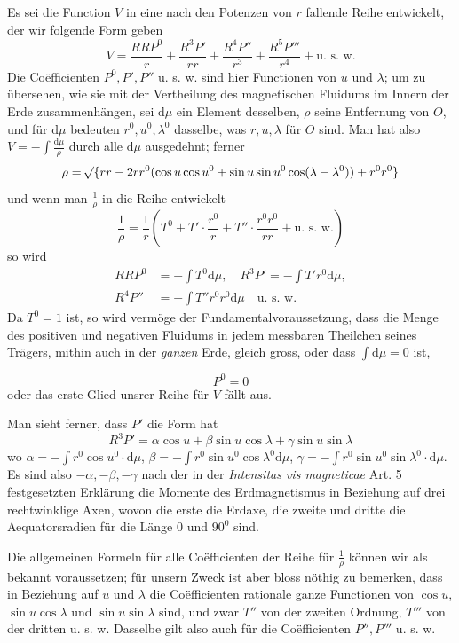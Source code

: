 Es sei die Function $V$ in eine nach den Potenzen von $r$ fallende Reihe entwickelt, der wir folgende Form geben
\[
V=\frac{RRP^0}{r}+\frac{R^3P'}{rr}+\frac{R^4P''}{r^3}+\frac{R^5P'''}{r^4}+\text{u. s. w.}
\]
Die Coëfficienten $P^0,P',P''$ u. s. w. sind hier Functionen von $u$ und $\lambda$; um zu übersehen, wie sie mit der Vertheilung des magnetischen Fluidums im Innern der Erde zusammenhängen, sei $\mathrm{d}\mu$ ein Element desselben, $\rho$ seine Entfernung von $O$, und für $\mathrm{d}\mu$ bedeuten $r^0,u^0,\lambda^0$ dasselbe, was $r,u,\lambda$ für $O$ sind. Man hat also $V=-\int\frac{\mathrm{d}\mu}{\rho}$ durch alle $\mathrm{d}\mu$ ausgedehnt; ferner
\[
\rho=\mathord{{}^{}\!\surd}\{rr-2rr^0(\cos u\cos u^0+\sin u\sin u^0\cos(\lambda-\lambda^0))+r^0r^0\}
\]
und wenn man $\frac1\rho$ in die Reihe entwickelt
\[
\frac1\rho=\frac1r(T^0+T'\cdot\frac{r^0}{r}+T''\cdot\frac{r^0r^0}{rr}+\text{u. s. w.})
\]
so wird
\[
\begin{aligned}RRP^0&=-\int T^0\mathrm{d}\mu,\quad R^3P'=-\int T'r^0\mathrm{d}\mu,\\R^4P''&=-\int T''r^0r^0\mathrm{d}\mu\quad\text{u. s. w.}\end{aligned}
\]
Da $T^0=1$ ist, so wird vermöge der Fundamentalvoraussetzung, dass die Menge des positiven und negativen Fluidums in jedem messbaren Theilchen seines Trägers, mithin auch in der \textit{ganzen} Erde, gleich gross, oder dass $\int\mathrm{d}\mu=0$ ist,
\par\clearpage
{}
\[
P^0=0
\]
oder das erste Glied unsrer Reihe für $V$ fällt aus.

Man sieht ferner, dass $P'$ die Form hat
\[
R^3P'=\alpha\cos u+\beta\sin u\cos\lambda+\gamma\sin u\sin\lambda
\]
wo $\alpha=-\int r^0\cos u^0\cdot\mathrm{d}\mu$, $\beta=-\int r^0\sin u^0\cos\lambda^0\mathrm{d}\mu$, $\gamma=-\int r^0\sin u^0\sin\lambda^0\cdot\mathrm{d}\mu$. Es sind also $-\alpha,-\beta,-\gamma$ nach der in der \textit{Intensitas vis magneticae} Art. 5 festgesetzten Erklärung die Momente des Erdmagnetismus in Beziehung auf drei rechtwinklige Axen, wovon die erste die Erdaxe, die zweite und dritte die Aequatorsradien für die Länge $0$ und $90^0$ sind.

Die allgemeinen Formeln für alle Coëfficienten der Reihe für $\frac1\rho$ können wir als bekannt voraussetzen; für unsern Zweck ist aber bloss nöthig zu bemerken, dass in Beziehung auf $u$ und $\lambda$ die Coëfficienten rationale ganze Functionen von $\cos u$, $\sin u\cos\lambda$ und $\sin u\sin\lambda$ sind, und zwar $T''$ von der zweiten Ordnung, $T'''$ von der dritten u. s. w. Dasselbe gilt also auch für die Coëfficienten $P'',P'''$ u. s. w.

